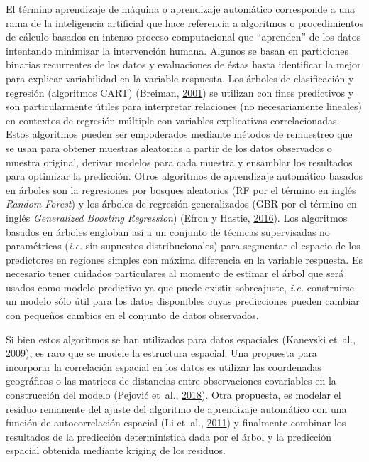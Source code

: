 \documentclass[11pt,b5paper,]{krantz}
\begin{document}
El término aprendizaje de máquina o aprendizaje automático corresponde a
una rama de la inteligencia artificial que hace referencia a algoritmos
o procedimientos de cálculo basados en intenso proceso computacional que
``aprenden'' de los datos intentando minimizar la intervención humana.
Algunos se basan en particiones binarias recurrentes de los datos y
evaluaciones de éstas hasta identificar la mejor para explicar
variabilidad en la variable respuesta. Los árboles de clasificación y
regresión (algoritmos CART) (Breiman,
\protect\hyperlink{ref-Breiman_2001}{2001}) se utilizan con fines
predictivos y son particularmente útiles para interpretar relaciones (no
necesariamente lineales) en contextos de regresión múltiple con
variables explicativas correlacionadas. Estos algoritmos pueden ser
empoderados mediante métodos de remuestreo que se usan para obtener
muestras aleatorias a partir de los datos observados o muestra original,
derivar modelos para cada muestra y ensamblar los resultados para
optimizar la predicción. Otros algoritmos de aprendizaje automático
basados en árboles son la regresiones por bosques aleatorios (RF por el
término en inglés \emph{Random Forest}) y los árboles de regresión
generalizados (GBR por el término en inglés \emph{Generalized Boosting
Regression}) (Efron y Hastie,
\protect\hyperlink{ref-Efron_Hastie_2016}{2016}). Los algoritmos basados
en árboles engloban así a un conjunto de técnicas supervisadas no
paramétricas (\emph{i.e.} sin supuestos distribucionales) para segmentar
el espacio de los predictores en regiones simples con máxima diferencia
en la variable respuesta. Es necesario tener cuidados particulares al
momento de estimar el árbol que será usados como modelo predictivo ya
que puede existir sobreajuste, \emph{i.e.} construirse un modelo sólo
útil para los datos disponibles cuyas predicciones pueden cambiar con
pequeños cambios en el conjunto de datos observados.

Si bien estos algoritmos se han utilizados para datos espaciales
(Kanevski et~al.,
\protect\hyperlink{ref-Kanevski_Timonin_Pozdnukhov_Ritter_2009}{2009}),
es raro que se modele la estructura espacial. Una propuesta para
incorporar la correlación espacial en los datos es utilizar las
coordenadas geográficas o las matrices de distancias entre observaciones
covariables en la construcción del modelo (Pejović et~al.,
\protect\hyperlink{ref-Pejoviux107_Nikoliux107_Heuvelink_Hengl_Kilibarda_Bajat_2018}{2018}).
Otra propuesta, es modelar el residuo remanente del ajuste del algoritmo
de aprendizaje automático con una función de autocorrelación espacial
(Li et~al., \protect\hyperlink{ref-Li_Heap_Potter_Daniell_2011}{2011}) y
finalmente combinar los resultados de la predicción determinística dada
por el árbol y la predicción espacial obtenida mediante kriging de los
residuos.
\end{document}
